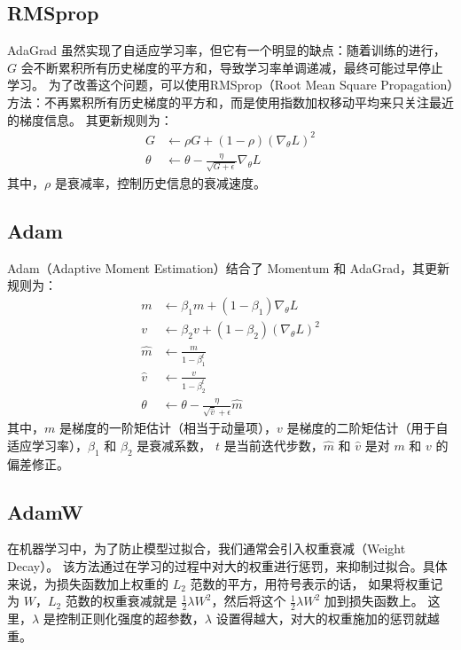 \subsection{RMSprop}
AdaGrad 虽然实现了自适应学习率，但它有一个明显的缺点：随着训练的进行，$G$ 会不断累积所有历史梯度的平方和，导致学习率单调递减，最终可能过早停止学习。
为了改善这个问题，可以使用RMSprop（Root Mean Square Propagation）方法：不再累积所有历史梯度的平方和，而是使用指数加权移动平均来只关注最近的梯度信息。
其更新规则为：
\begin{align*}
	G      & \leftarrow \rho G + (1 - \rho) (\nabla_\theta L)^2                   \\
	\theta & \leftarrow \theta - \frac{\eta}{\sqrt{G + \epsilon}} \nabla_\theta L
\end{align*}
其中，$\rho$ 是衰减率，控制历史信息的衰减速度。

\subsection{Adam}
Adam（Adaptive Moment Estimation）结合了 Momentum 和 AdaGrad，其更新规则为：
\begin{align*}
	m       & \leftarrow \beta_1 m + (1 - \beta_1) \nabla_\theta L               \\
	v       & \leftarrow \beta_2 v + (1 - \beta_2) (\nabla_\theta L)^2           \\
	\hat{m} & \leftarrow \frac{m}{1 - \beta_1^t}                                 \\
	\hat{v} & \leftarrow \frac{v}{1 - \beta_2^t}                                 \\
	\theta  & \leftarrow \theta - \frac{\eta}{\sqrt{\hat{v}} + \epsilon} \hat{m}
\end{align*}
其中，$m$ 是梯度的一阶矩估计（相当于动量项），$v$ 是梯度的二阶矩估计（用于自适应学习率），$\beta_1$ 和 $\beta_2$ 是衰减系数，
$t$ 是当前迭代步数，$\hat{m}$ 和 $\hat{v}$ 是对 $m$ 和 $v$ 的偏差修正。

\subsection{AdamW}
在机器学习中，为了防止模型过拟合，我们通常会引入权重衰减（Weight Decay）。
该方法通过在学习的过程中对大的权重进行惩罚，来抑制过拟合。具体来说，为损失函数加上权重的 $L_2$ 范数的平方，用符号表示的话，
如果将权重记为 $W$，$L_2$ 范数的权重衰减就是 $\frac{1}{2}\lambda W^2$，然后将这个 $\frac{1}{2}\lambda W^2$ 加到损失函数上。
这里，$\lambda$ 是控制正则化强度的超参数，$\lambda$ 设置得越大，对大的权重施加的惩罚就越重。

